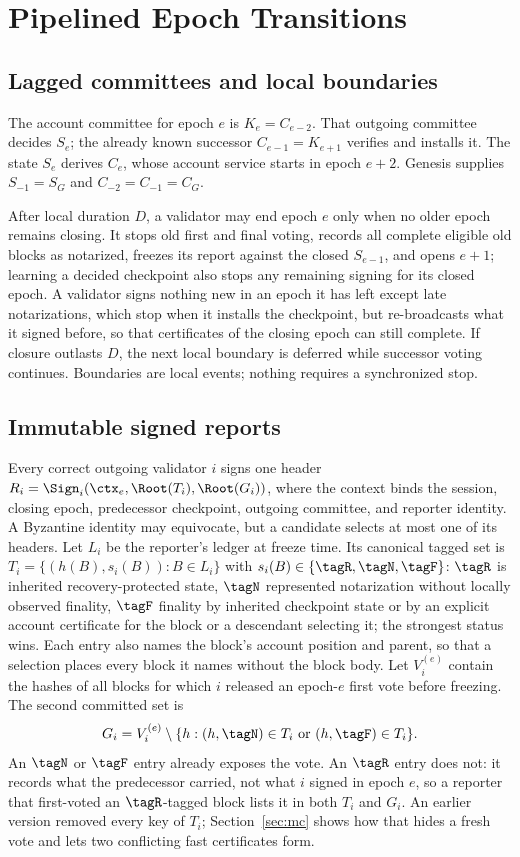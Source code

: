 \section{Pipelined Epoch Transitions}
\label{sec:transitions}
\subsection{Lagged committees and local boundaries}
\label{sec:lifecycle}
The account committee for epoch $e$ is $K_e=C_{e-2}$. That outgoing committee decides $S_e$; the already known successor $C_{e-1}=K_{e+1}$ verifies and installs it. The state $S_e$ derives $C_e$, whose account service starts in epoch $e+2$. Genesis supplies $S_{-1}=S_G$ and $C_{-2}=C_{-1}=C_G$.

After local duration $D$, a validator may end epoch $e$ only when no older epoch remains closing. It stops old first and final voting, records all complete eligible old blocks as notarized, freezes its report against the closed $S_{e-1}$, and opens $e+1$; learning a decided checkpoint also stops any remaining signing for its closed epoch. A validator signs nothing new in an epoch it has left except late notarizations, which stop when it installs the checkpoint, but re-broadcasts what it signed before, so that certificates of the closing epoch can still complete. If closure outlasts $D$, the next local boundary is deferred while successor voting continues. Boundaries are local events; nothing requires a synchronized stop.

\subsection{Immutable signed reports}
\label{sec:reports}
Every correct outgoing validator $i$ signs one header $R_i=\Sign_i(\ctx_e,\Root(T_i),\Root(G_i))$, where the context binds the session, closing epoch, predecessor checkpoint, outgoing committee, and reporter identity. A Byzantine identity may equivocate, but a candidate selects at most one of its headers. Let $L_i$ be the reporter's ledger at freeze time. Its canonical tagged set is $T_i=\{(h(B),s_i(B)):B\in L_i\}$ with $s_i(B)\in\{\tagR,\tagN,\tagF\}$: $\tagR$ is inherited recovery-protected state, $\tagN$ represented notarization without locally observed finality, $\tagF$ finality by inherited checkpoint state or by an explicit account certificate for the block or a descendant selecting it; the strongest status wins. Each entry also names the block's account position and parent, so that a selection places every block it names without the block body. Let $V_i^{(e)}$ contain the hashes of all blocks for which $i$ released an epoch-$e$ first vote before freezing. The second committed set is
\[
G_i=V_i^{(e)}\setminus\{h:(h,\tagN)\in T_i\ \text{or}\ (h,\tagF)\in T_i\}.
\]
An $\tagN$ or $\tagF$ entry already exposes the vote. An $\tagR$ entry does not: it records what the predecessor carried, not what $i$ signed in epoch $e$, so a reporter that first-voted an $\tagR$-tagged block lists it in both $T_i$ and $G_i$. An earlier version removed every key of $T_i$; Section~\ref{sec:mc} shows how that hides a fresh vote and lets two conflicting fast certificates form.

